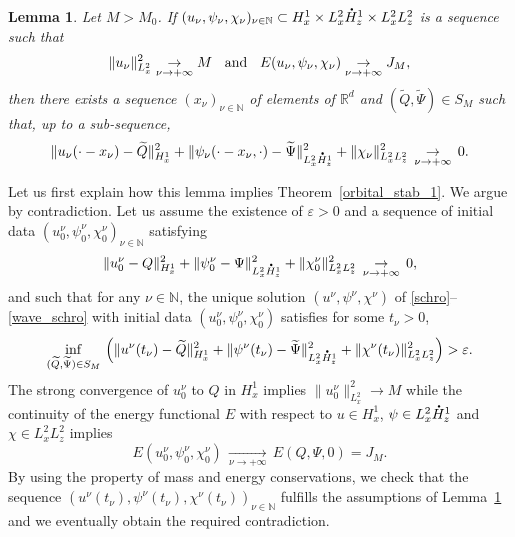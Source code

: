 \documentclass[JEP,XML,SOM,NoEqCountersInSection,NoFloatCountersInSection,Unicode,published]{cedram}
\newtheorem{lemma}{Lemma}[section]
\theoremstyle{definition}
\newcommand*{\overbigdot}[1]{%
\accentset{\mbox{\large\bfseries .}}{#1}}
\newcommand{\R}{\mathbb{R}}
\begin{document}
\begin{lemma}\label{key_lemma_stab1}
Let $M>M_0$.
If $(u_{\nu},\psi_{\nu},\chi_{\nu})_{\nu\in\mathbb N}\subset H_{x}^{1}\times L_{x}^{2}\overbigdot{H}_{z}^{1}\times L_{x}^{2}L_{z}^{2}$ is a sequence such that
\[
\|u_{\nu}\|_{L_{x}^{2}}^{2}\underset{\nu\to+\infty}{\to}M \hspace{0.2cm}\text{ and }\hspace{0.2cm} E(u_{\nu},\psi_{\nu},\chi_{\nu})\underset{\nu\to+\infty}{\to}J_{M},
\]
then there exists a sequence $(x_{\nu})_{\nu\in\mathbb N}$
of elements of
$\R^{d}$ and $(\widetilde{Q},\widetilde{\Psi})\in S_{M}$ such that, up to a sub-sequence,
\[
\|u_{\nu}(\cdot-x_{\nu})-\widetilde{Q}\|_{H_{x}^{1}}^{2}+\|\psi_{\nu}(\cdot-x_{\nu},\cdot)-\widetilde{\Psi}\|_{L_{x}^{2}\overbigdot{H}_{z}^{1}}^{2}+\|\chi_{\nu}\|_{L_{x}^{2}L_{z}^{2}}^{2}\,\underset{\nu\to +\infty}{\to}\,0.
\]
\end{lemma}

Let us first explain how this lemma implies Theorem~\ref{orbital_stab_1}. We argue by contradiction. Let us assume the existence of $\varepsilon>0$ and a sequence of initial data $(u_{0}^{\nu},\psi_{0}^{\nu},\chi_{0}^{\nu})_{\nu\in\mathbb N}$ satisfying
\[
\|u_{0}^{\nu}-Q\|_{H_{x}^{1}}^{2}+\|\psi_{0}^{\nu}-\Psi\|_{L_{x}^{2}\overbigdot{H}_{z}^{1}}^{2}+\|\chi_{0}^{\nu}\|_{L_{x}^{2}L_{z}^{2}}^{2}\,\underset{\nu\to +\infty}{\to}\,0,
\]
and such that for any $\nu\in\mathbb{N}$, the unique solution $(u^{\nu},\psi^{\nu},\chi^{\nu})$ of \eqref{schro}--\eqref{wave_schro}
with initial data $(u_{0}^{\nu},\psi_{0}^{\nu},\chi_{0}^{\nu})$ satisfies for some $t_{\nu}>0$,
\[
\underset{(\widetilde{Q},\widetilde{\Psi})\in S_{M}}{\inf}\,\left(\|u^{\nu}(t_{\nu})-\widetilde{Q}\|_{H_{x}^{1}}^{2}+\|\psi^{\nu}(t_{\nu})-\widetilde{\Psi}\|_{L_{x}^{2}\overbigdot{H}_{z}^{1}}^{2}+\|\chi^{\nu}(t_{\nu})\|_{L_{x}^{2}L_{z}^{2}}^{2}\right)>\varepsilon.
\]
The strong convergence of $u_{0}^{\nu}$ to $Q$ in $H_{x}^{1}$ implies $\|u_{0}^{\nu}\|_{L_{x}^{2}}^{2}\to M$ while the continuity of the energy functional $E$ with respect to $u\in H_{x}^{1}$, $\psi\in L_{x}^{2}\overbigdot{H}_{z}^{1}$ and $\chi\in L_{x}^{2}L_{z}^{2}$ implies
\[
E(u_{0}^{\nu},\psi_{0}^{\nu},\chi_{0}^{\nu})\,\underset{\nu\to+\infty}{\to}\,E(Q,\Psi,0)=J_{M}.
\]
By using the property of mass and energy conservations, we check that the sequence $(u^{\nu}(t_{\nu}) , \psi^{\nu}(t_{\nu}) , \chi^{\nu}(t_{\nu}) )_{\nu\in\mathbb N}$ fulfills the assumptions of Lemma~\ref{key_lemma_stab1} and we eventually obtain the required contradiction.
\end{document}
